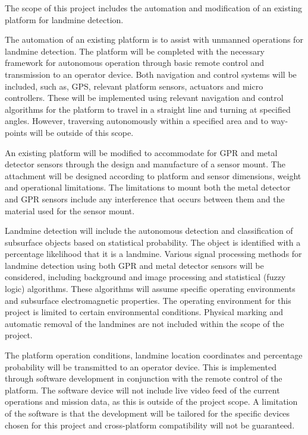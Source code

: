 \documentclass[main.tex]{subfiles}
\begin{document}
The scope of this project includes the automation and modification of an existing platform for landmine detection. %

The automation of an existing platform is to assist with unmanned operations for landmine detection. The platform will be completed with the necessary framework for autonomous operation through basic remote control and transmission to an operator device. Both navigation and control systems will be included, such as, GPS, relevant platform sensors, actuators and micro controllers. These will be implemented using relevant navigation and control algorithms for the platform to travel in a straight line and turning at specified angles. However, traversing autonomously within a specified area and to way-points will be outside of this scope. 

An existing platform will be modified to accommodate for GPR and metal detector sensors through the design and manufacture of a sensor mount. The attachment will be designed according to platform and sensor dimensions, weight and operational limitations. The limitations to mount both the metal detector and GPR sensors include any interference that occurs between them and the material used for the sensor mount.

Landmine detection will include the autonomous detection and classification of subsurface objects based on statistical probability. The object is identified with a percentage likelihood that it is a landmine. Various signal processing methods for landmine detection using both GPR and metal detector sensors will be considered, including background and image processing and statistical (fuzzy logic) algorithms. These algorithms will assume specific operating environments and subsurface electromagnetic properties. The operating environment for this project is limited to certain environmental conditions. Physical marking and automatic removal of the landmines are not included within the scope of the project.

The platform operation conditions, landmine location coordinates and percentage probability will be transmitted to an operator device. This is implemented through software development in conjunction with the remote control of the platform. The software device will not include live video feed of the current operations and mission data, as this is outside of the project scope. A limitation of the software is that the development will be tailored for the specific devices chosen for this project and cross-platform compatibility will not be guaranteed.
 
\end{document}

